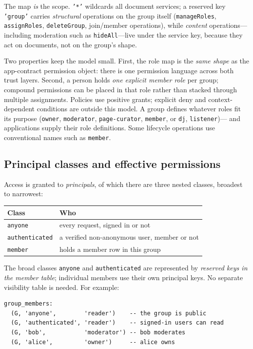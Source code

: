 \documentclass[sigconf, nonacm]{acmart}
\begin{document}
The map \emph{is} the scope. \texttt{'*'} wildcards all document services; a
reserved key \texttt{'group'} carries \emph{structural} operations on the
group itself (\texttt{manageRoles}, \texttt{assignRoles},
\texttt{deleteGroup}, join/member operations), while \emph{content}
operations---including moderation such as \texttt{hideAll}---live under the
service key, because they act on documents, not on the group's shape.

Two properties keep the model small. First, the role map is the
\emph{same shape} as the app-contract permission object: there is one
permission language across both trust layers. Second, a person holds
\emph{one explicit member role} per group; compound permissions can be placed
in that role rather than stacked through multiple assignments. Policies use
positive grants; explicit deny and context-dependent conditions are outside
this model. A group defines
whatever roles fit its purpose (\texttt{owner}, \texttt{moderator},
\texttt{page-curator}, \texttt{member}, or \texttt{dj}, \texttt{listener})---
and applications supply their role definitions. Some lifecycle operations use
conventional names such as \texttt{member}.

\subsection{Principal classes and effective permissions}

Access is granted to \emph{principals}, of which there are three nested
classes, broadest to narrowest:

\begin{center}
\small
\begin{tabular}{ll}
\toprule
\textbf{Class} & \textbf{Who} \\
\midrule
\texttt{anyone}        & every request, signed in or not \\
\texttt{authenticated} & a verified non-anonymous user, member or not \\
\texttt{member}        & holds a member row in this group \\
\bottomrule
\end{tabular}
\end{center}

The broad classes \texttt{anyone} and \texttt{authenticated} are represented by
\emph{reserved keys in the member table}; individual members use their own
principal keys. No separate visibility table is needed. For example:

\begin{lstlisting}[style=sql]
group_members:
  (G, 'anyone',        'reader')    -- the group is public
  (G, 'authenticated', 'reader')    -- signed-in users can read
  (G, 'bob',           'moderator') -- bob moderates
  (G, 'alice',         'owner')     -- alice owns
\end{lstlisting}
\end{document}
